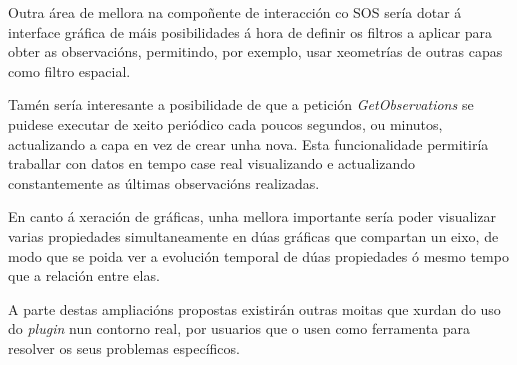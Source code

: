 Outra área de mellora na compoñente de interacción co SOS sería dotar á interface gráfica de máis posibilidades á hora de definir os filtros a aplicar para obter as observacións, permitindo, por exemplo, usar xeometrías de outras capas como filtro espacial.

Tamén sería interesante a posibilidade de que a petición \emph{GetObservations} se puidese executar de xeito periódico cada poucos segundos, ou minutos, actualizando a capa en vez de crear unha nova. Esta funcionalidade permitiría traballar con datos en tempo case real visualizando e actualizando constantemente as últimas observacións realizadas.

En canto á xeración de gráficas, unha mellora importante sería poder visualizar varias propiedades simultaneamente en dúas gráficas que compartan un eixo, de modo que se poida ver a evolución temporal de dúas propiedades ó mesmo tempo que a relación entre elas.

A parte destas ampliacións propostas existirán outras moitas que xurdan do uso do \emph{plugin} nun contorno real, por usuarios que o usen como ferramenta para resolver os seus problemas específicos.